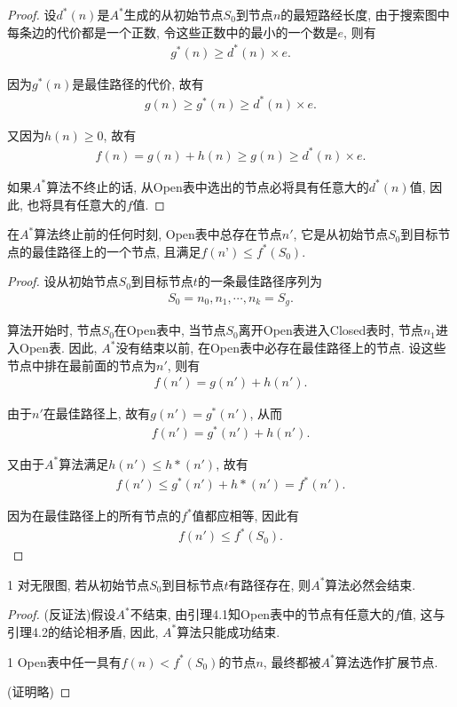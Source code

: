 \begin{proof}
    设$d^*(n)$是$A^*$生成的从初始节点$S_0$到节点$n$的最短路经长度, 由于搜索图中每条边的代价都是一个正数, 令这些正数中的最小的一个数是$e$, 则有
\begin{align}
    g^*(n)\geq d^*(n)\times e.
\end{align}

因为$g^*(n)$是最佳路径的代价, 故有
\begin{align}
    g(n)\geq g^*(n)\geq d^*(n)\times e.
\end{align}

又因为$h(n)\geq 0$, 故有
\begin{align}
    f(n)=g(n)+h(n)\geq g(n)\geq d^*(n)\times e.
\end{align}

如果$A^*$算法不终止的话, 从Open表中选出的节点必将具有任意大的$d^*(n)$值, 因此, 也将具有任意大的$f$值.
\end{proof}
\begin{mylem}{}{}\label{AIlem002}
    在$A^*$算法终止前的任何时刻, Open表中总存在节点$n'$, 它是从初始节点$S_0$到目标节点的最佳路径上的一个节点, 且满足$f(n’)\leq f^*(S_0)$.
\end{mylem}
\begin{proof}
    设从初始节点$S_0$到目标节点$t$的一条最佳路径序列为
\begin{align}
  S_0= n_0, n_1, \cdots , n_k=S_g.
\end{align}

算法开始时, 节点$S_0$在Open表中, 当节点$S_0$离开Open表进入Closed表时, 节点$n_1$进入Open表. 因此, $A^*$没有结束以前, 在Open表中必存在最佳路径上的节点. 设这些节点中排在最前面的节点为$n'$, 则有
\begin{align}
    f(n')=g(n')+h(n').
\end{align}

由于$n'$在最佳路径上, 故有$g(n')=g^*(n')$, 从而
\begin{align}
    f(n')=g^*(n')+h(n').
\end{align}

又由于$A^*$算法满足$h(n')\leq h*(n')$, 故有
\begin{align}
    f(n')\leq g^*(n')+h*(n')=f^*(n').
\end{align}

因为在最佳路径上的所有节点的$f^*$值都应相等, 因此有
\begin{align}
    f(n')\leq f^*(S_0).
\end{align}
\end{proof}
\begin{mythm}{}{1}
对无限图, 若从初始节点$S_0$到目标节点$t$有路径存在, 则$A^*$算法必然会结束.
\end{mythm}
\begin{proof}
(反证法)假设$A^*$不结束, 由引理4.1知Open表中的节点有任意大的$f$值, 这与引理4.2的结论相矛盾, 因此, $A^*$算法只能成功结束.

\begin{myprop}{}{1}
  Open表中任一具有$f(n)<f^*(S_0)$的节点$n$, 最终都被$A^*$算法选作扩展节点.
\end{myprop}
(证明略)
\end{proof}

